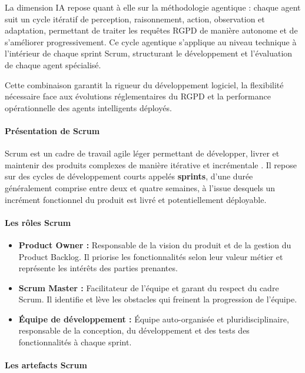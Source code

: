 \documentclass[12pt,a4paper]{report}
\begin{document}
La dimension IA repose quant à elle sur la méthodologie agentique : chaque agent suit un cycle itératif de perception, raisonnement, action, observation et adaptation, permettant de traiter les requêtes RGPD de manière autonome et de s'améliorer progressivement. Ce cycle agentique s'applique au niveau technique à l'intérieur de chaque sprint Scrum, structurant le développement et l'évaluation de chaque agent spécialisé.

Cette combinaison garantit la rigueur du développement logiciel, la flexibilité nécessaire face aux évolutions réglementaires du RGPD et la performance opérationnelle des agents intelligents déployés.

\paragraph{Présentation de Scrum}

Scrum est un cadre de travail agile léger permettant de développer, livrer et maintenir des produits complexes de manière itérative et incrémentale \cite{schwaber_scrum}. Il repose sur des cycles de développement courts appelés \textbf{sprints}, d'une durée généralement comprise entre deux et quatre semaines, à l'issue desquels un incrément fonctionnel du produit est livré et potentiellement déployable.

\paragraph{Les rôles Scrum}

\begin{itemize}[leftmargin=*, label=\textbullet]
    \item \textbf{Product Owner :} Responsable de la vision du produit et de la gestion du Product Backlog. Il priorise les fonctionnalités selon leur valeur métier et représente les intérêts des parties prenantes.
    \item \textbf{Scrum Master :} Facilitateur de l'équipe et garant du respect du cadre Scrum. Il identifie et lève les obstacles qui freinent la progression de l'équipe.
    \item \textbf{Équipe de développement :} Équipe auto-organisée et pluridisciplinaire, responsable de la conception, du développement et des tests des fonctionnalités à chaque sprint.
\end{itemize}

\paragraph{Les artefacts Scrum}
\end{document}

